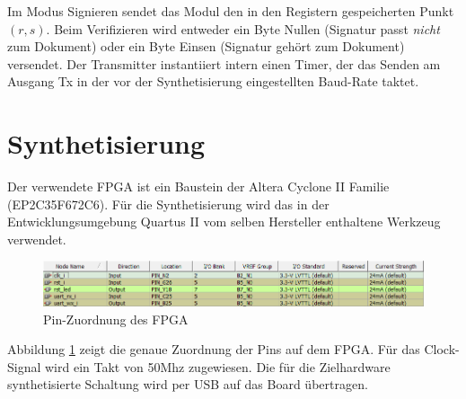 Im Modus Signieren sendet das Modul den in den Registern gespeicherten Punkt $(r, s)$. Beim Verifizieren wird entweder ein Byte Nullen (Signatur passt \textit{nicht} zum Dokument) oder ein Byte Einsen (Signatur gehört zum Dokument) versendet. Der Transmitter instantiiert intern einen Timer, der das Senden am Ausgang Tx in der vor der Synthetisierung eingestellten Baud-Rate taktet. \\



\section{Synthetisierung}

Der verwendete FPGA ist ein Baustein der Altera Cyclone II Familie (EP2C35F672C6). Für die Synthetisierung wird das in der Entwicklungsumgebung Quartus II vom selben Hersteller enthaltene Werkzeug verwendet. \\

\begin{figure}[H]
	\centering
  	\includegraphics[width=\textwidth]{bilder/pins}
	\caption{Pin-Zuordnung des FPGA}
	\label{fig:pins}
\end{figure}

Abbildung \ref{fig:pins} zeigt die genaue Zuordnung der Pins auf dem FPGA. Für das Clock-Signal wird ein Takt von 50Mhz zugewiesen. Die für die Zielhardware synthetisierte Schaltung wird per USB auf das Board übertragen. \\



